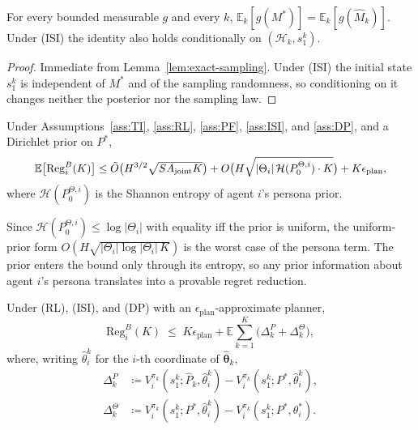 \begin{lemma}
\label{lem:matching}
For every bounded measurable $g$ and every $k$, $\mathbb{E}_k[g(M^*)] = \mathbb{E}_k[g(\hat M_k)]$. Under (ISI) the identity also holds conditionally on $(\mathcal H_k, s_1^k)$.
\end{lemma}

\begin{proof}
Immediate from Lemma~\ref{lem:exact-sampling}. Under (ISI) the initial state $s_1^k$ is independent of $M^*$ and of the sampling randomness, so conditioning on it changes neither the posterior nor the sampling law.
\end{proof}

\begin{theorem}
\label{thm:main-regret-app}
Under Assumptions~\ref{ass:TI}, \ref{ass:RL}, \ref{ass:PF}, \ref{ass:ISI}, and \ref{ass:DP}, and a Dirichlet prior on $P^*$,
\begin{equation}\label{eq:main-regret-sketch}\resizebox{0.9\linewidth}{!}{$\displaystyle \mathbb{E}\big[\mathrm{Reg}_i^B(K)\big] \leq \tilde O\big(H^{3/2}\sqrt{S A_{\mathrm{joint}} K}\big) + O\big(H\sqrt{|\Theta_i|\,\mathcal H(P_0^{\Theta,i})\cdot K}\big) + K\epsilon_{\mathrm{plan}}, $}\end{equation}
where $\mathcal H(P_0^{\Theta,i})$ is the Shannon entropy of agent $i$'s persona prior.
\end{theorem}

Since $\mathcal H(P_0^{\Theta,i}) \le \log|\Theta_i|$ with equality iff the prior is uniform, the uniform-prior form $O(H\sqrt{|\Theta_i|\log|\Theta_i|\,K})$ is the worst case of the persona term. The prior enters the bound only through its entropy, so any prior information about agent $i$'s persona translates into a provable regret reduction.

\begin{lemma}
\label{lem:decomp}
Under (RL), (ISI), and (DP) with an $\epsilon_{\mathrm{plan}}$-approximate planner,
\begin{equation*}
\mathrm{Reg}_i^B(K) \;\le\; K\epsilon_{\mathrm{plan}} + \mathbb{E}\sum_{k=1}^{K}\big(\Delta_k^{P} + \Delta_k^{\Theta}\big),
\end{equation*}
where, writing $\hat\theta_i^k$ for the $i$-th coordinate of $\hat{\boldsymbol\theta}_k$,
\begin{align*}
\Delta_k^{P} &\coloneqq V_i^{\pi_k}(s_1^k; \hat P_k, \hat\theta_i^k) - V_i^{\pi_k}(s_1^k; P^*, \hat\theta_i^k),\\
\Delta_k^{\Theta} &\coloneqq V_i^{\pi_k}(s_1^k; P^*, \hat\theta_i^k) - V_i^{\pi_k}(s_1^k; P^*, \theta_i^*).
\end{align*}
\end{lemma}

